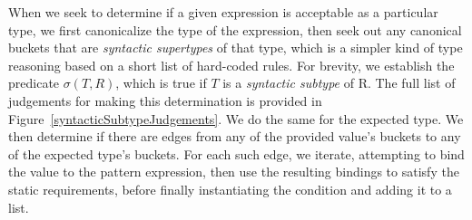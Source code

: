 When we seek to determine if a given expression is acceptable as a particular type, we first canonicalize the type of the expression, then seek out any canonical buckets that are \emph{syntactic supertypes} of that type, which is a simpler kind of type reasoning based on a short list of hard-coded rules.  For brevity, we establish the predicate $\sigma(T, R)$, which is true if $T$ is a \emph{syntactic subtype} of R.  The full list of judgements for making this determination is provided in Figure~\ref{syntacticSubtypeJudgements}.  We do the same for the expected type.  We then determine if there are edges from any of the provided value's buckets to any of the expected type's buckets.  For each such edge, we iterate, attempting to bind the value to the pattern expression, then use the resulting bindings to satisfy the static requirements, before finally instantiating the condition and adding it to a list.

